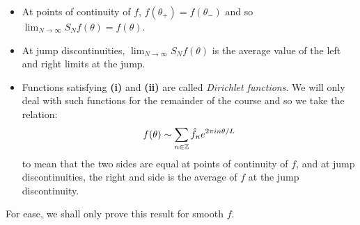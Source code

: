 \documentclass[../main.tex]{subfiles}
\begin{document}
\begin{remark}[Remarks]
  \begin{itemize}
    \item At points of continuity of $f$, $f(\theta_{+}) = f(\theta_{-})$ and so $\lim_{N \to \infty} S_{N} f(\theta) = f(\theta)$.
    \item At jump discontinuities, $\lim_{N \to \infty} S_{N} f(\theta)$ is the average value of the left and right limits at the jump.
    \item Functions satisfying \textbf{(i)} and \textbf{(ii)} are called \textit{Dirichlet functions}.
      We will only deal with such functions for the remainder of the course and so we take the relation:
      \[
        f(\theta) \sim \sum_{n \in \mathbb{Z}} \hat{f}_{n} e^{2 \pi i n \theta / L}
      \]
      to mean that the two sides are equal at points of continuity of $f$, and at jump discontinuities, the right and side is the average of $f$ at the jump discontinuity.
  \end{itemize}
\end{remark}
For ease, we shall only prove this result for smooth $f$.
\end{document}
